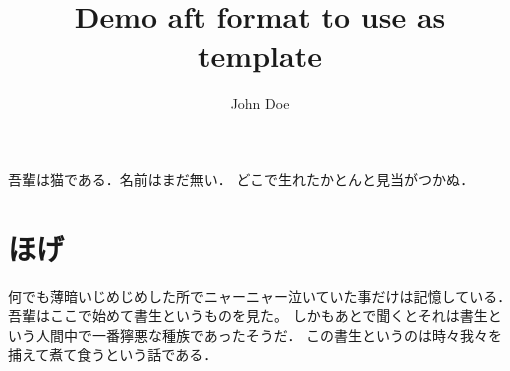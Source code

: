 \documentclass[a4paper]{jjpsy}
\title{Demo aft format to use as template}
\author{John Doe}
\date{}
\begin{document}
\linenumbers
吾輩は猫である．名前はまだ無い．
どこで生れたかとんと見当がつかぬ．

\section{ほげ}
何でも薄暗いじめじめした所でニャーニャー泣いていた事だけは記憶している．吾輩はここで始めて書生というものを見た。
しかもあとで聞くとそれは書生という人間中で一番獰悪な種族であったそうだ．
この書生というのは時々我々を捕えて煮て食うという話である．
\end{document}
